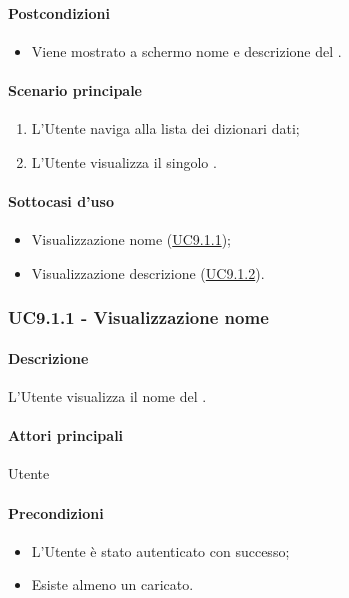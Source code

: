 \paragraph*{Postcondizioni}
\begin{itemize}
  \item Viene mostrato a schermo nome e descrizione del .
\end{itemize}
\paragraph*{Scenario principale}
\begin{enumerate}
  \item L’Utente naviga alla lista dei dizionari dati;
  \item L’Utente visualizza il singolo .
\end{enumerate}
\paragraph*{Sottocasi d'uso}
\begin{itemize}
  \item Visualizzazione nome  (\hyperref[UC9point1point1]{UC9.1.1});
  \item Visualizzazione descrizione  (\hyperref[UC9point1point2]{UC9.1.2}).
\end{itemize}

\subsubsection{UC9.1.1 - Visualizzazione nome }\label{UC9point1point1}
\paragraph*{Descrizione}
L’Utente visualizza il nome del .

\paragraph*{Attori principali} Utente
\paragraph*{Precondizioni}
\begin{itemize}
  \item L’Utente è stato autenticato con successo;
  \item Esiste almeno un  caricato.
\end{itemize}
